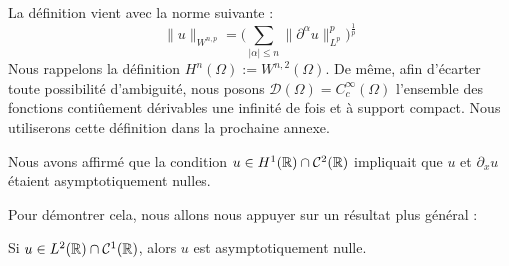 La définition vient avec la norme suivante :
$$\|u\|_{W^{n,p}} = \bigg( \sum_{| \alpha | \leq n} \| \partial^{\alpha} u \|_{L^p}^p \bigg)^{\frac{1}{p}} $$
Nous rappelons la définition $H^n(\Omega) := W^{n,2}(\Omega)$.
De même, afin d'écarter toute possibilité d'ambiguité, nous posons $\mathcal{D}(\Omega) = C^{\infty}_c(\Omega)$ l'ensemble des fonctions contiûement dérivables une infinité de fois et à support compact.
Nous utiliserons cette définition dans la prochaine annexe.
\vspace{1em}

Nous avons affirmé que la condition $u \in H^1(\mathbb{R}) \cap \mathcal{C}^2(\mathbb{R})$ impliquait que $u$ et $\partial_x u$ étaient asymptotiquement nulles.

Pour démontrer cela, nous allons nous appuyer sur un résultat plus général :
\begin{lemmabox}
\begin{lemma}
    Si $u \in L^2(\mathbb{R}) \cap \mathcal{C}^1(\mathbb{R})$, alors $u$ est asymptotiquement nulle.
\end{lemma}
\end{lemmabox}

